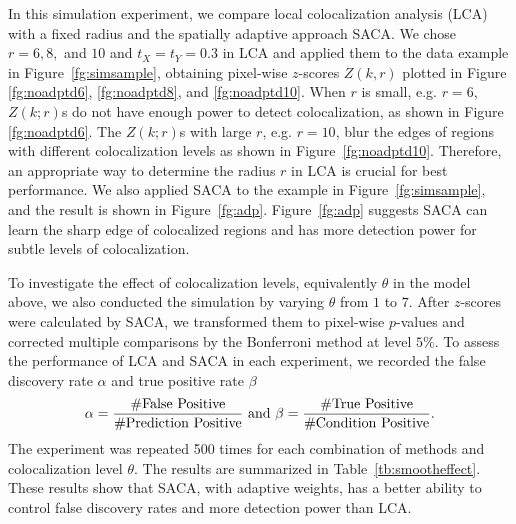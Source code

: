 \documentclass[10pt,twocolumn,twoside]{IEEEtran}
\begin{document}
In this simulation experiment, we compare local colocalization analysis (LCA) with a fixed radius and the spatially adaptive approach SACA. We chose $r=6, 8,$ and $10$ and $t_X=t_Y=0.3$ in LCA and applied them to the data example in Figure~\ref{fg:simsample}, obtaining pixel-wise $z$-scores $Z(k,r)$ plotted in Figure \ref{fg:noadptd6}, \ref{fg:noadptd8}, and \ref{fg:noadptd10}. When $r$ is small, e.g. $r=6$, $Z(k;r)$s do not have enough power to detect colocalization, as shown in Figure \ref{fg:noadptd6}. The $Z(k;r)$s with large $r$, e.g. $r=10$, blur the edges of regions with different colocalization levels as shown in Figure~\ref{fg:noadptd10}. Therefore, an appropriate way to determine the radius $r$ in LCA is crucial for best performance. We also applied SACA to the example in Figure~\ref{fg:simsample}, and the result is shown in Figure~\ref{fg:adp}. Figure~\ref{fg:adp} suggests SACA can learn the sharp edge of colocalized regions and has more detection power for subtle levels of colocalization.
 
To investigate the effect of colocalization levels, equivalently $\theta$ in the model above, we also conducted the simulation by varying $\theta$ from $1$ to $7$. After $z$-scores were calculated by SACA, we transformed them to pixel-wise $p$-values and corrected multiple comparisons by the Bonferroni method at level $5\%$. To assess the performance of LCA and SACA in each experiment, we recorded the false discovery rate $\alpha$ and true positive rate $\beta$
$$
\alpha={\#{\rm False\ Positive}\over \#{\rm Prediction\ Positive}}\ {\rm and}\ \beta={\#{\rm True\ Positive} \over \#{\rm Condition\ Positive}}.
$$
The experiment was repeated 500 times for each combination of methods and colocalization level $\theta$.  The results are summarized in Table~\ref{tb:smootheffect}. These results show that SACA, with adaptive weights, has a better ability to control false discovery rates and more detection power than LCA.
\end{document}
